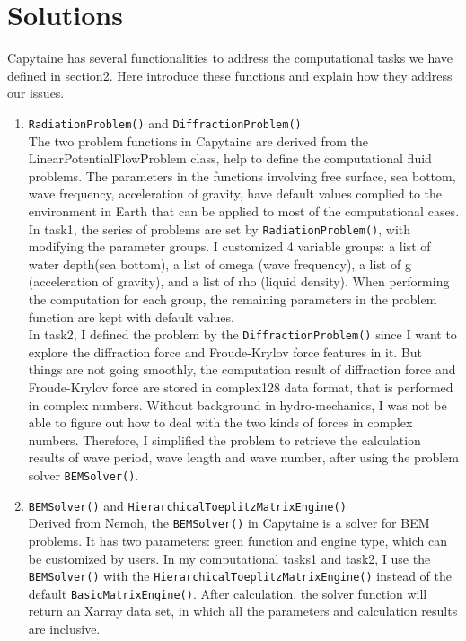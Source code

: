 \documentclass{article}
\begin{document}
\section{Solutions}
Capytaine has several functionalities to address the computational tasks we have defined in section2. Here introduce these functions and explain how they address our issues.
\begin{enumerate}
    \item \texttt{RadiationProblem()} and \texttt{DiffractionProblem()}\\
    The two problem functions in Capytaine are derived from the LinearPotentialFlowProblem class, help to define the computational fluid problems. The parameters in the functions involving free surface, sea bottom, wave frequency, acceleration of gravity, have default values complied to the environment in Earth that can be applied to most of the computational cases. \\
    In task1, the series of problems are set by \texttt{RadiationProblem()}, with modifying the parameter groups. I customized 4 variable groups: a list of water depth(sea bottom), a list of omega (wave frequency), a list of g (acceleration of gravity), and a list of rho (liquid density). When performing the computation for each group, the remaining parameters in the problem function are kept with default values. \\
    In task2, I defined the problem by the \texttt{DiffractionProblem()} since I want to explore the diffraction force and Froude-Krylov force features in it. But things are not going smoothly, the computation result of diffraction force and Froude-Krylov force are stored in complex128 data format, that is performed in complex numbers. Without background in hydro-mechanics, I was not be able to figure out how to deal with the two kinds of forces in complex numbers. Therefore, I simplified the problem to retrieve the calculation results of wave period, wave length and wave number, after using the problem solver \texttt{BEMSolver()}.
    \item \texttt{BEMSolver()} and \texttt{HierarchicalToeplitzMatrixEngine()}\\
    Derived from Nemoh, the \texttt{BEMSolver()} in Capytaine is a solver for BEM problems. It has two parameters: green function and engine type, which can be customized by users. In my computational tasks1 and task2, I use the \texttt{BEMSolver()} with the \texttt{HierarchicalToeplitzMatrixEngine()} instead of the default \texttt{BasicMatrixEngine()}. After calculation, the solver function will return an Xarray data set, in which all the parameters and calculation results are inclusive.

\end{enumerate}
\end{document}
